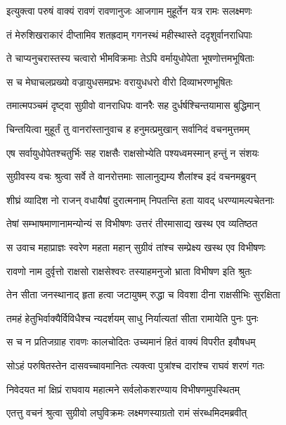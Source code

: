 
\twolineshloka
{इत्युक्त्वा परुषं वाक्यं रावणं रावणानुजः}
{आजगाम मुहूर्तेन यत्र रामः सलक्ष्मणः} %

\twolineshloka
{तं मेरुशिखराकारं दीप्तामिव शतह्रदाम्}
{गगनस्थं महीस्थास्ते ददृशुर्वानराधिपाः} %

\twolineshloka
{ते चाप्यनुचरास्तस्य चत्वारो भीमविक्रमाः}
{तेऽपि वर्मायुधोपेता भूषणोत्तमभूषिताः} %

\twolineshloka
{स च मेघाचलप्रख्यो वज्रायुधसमप्रभः}
{वरायुधधरो वीरो दिव्याभरणभूषितः} %

\twolineshloka
{तमात्मपञ्चमं दृष्ट्वा सुग्रीवो वानराधिपः}
{वानरैः सह दुर्धर्षश्चिन्तयामास बुद्धिमान्} %

\twolineshloka
{चिन्तयित्वा मुहूर्तं तु वानरांस्तानुवाच ह}
{हनुमत्प्रमुखान् सर्वानिदं वचनमुत्तमम्} %

\twolineshloka
{एष सर्वायुधोपेतश्चतुर्भिः सह राक्षसैः}
{राक्षसोभ्येति पश्यध्वमस्मान् हन्तुं न संशयः} %

\twolineshloka
{सुग्रीवस्य वचः श्रुत्वा सर्वे ते वानरोत्तमाः}
{सालानुद्यम्य शैलांश्च इदं वचनमब्रुवन्} %

\twolineshloka
{शीघ्रं व्यादिश नो राजन् वधायैषां दुरात्मनाम्}
{निपतन्ति हता यावद् धरण्यामल्पचेतनाः} %

\twolineshloka
{तेषां सम्भाषमाणानामन्योन्यं स विभीषणः}
{उत्तरं तीरमासाद्य खस्थ एव व्यतिष्ठत} %

\twolineshloka
{स उवाच महाप्राज्ञः स्वरेण महता महान्}
{सुग्रीवं तांश्च सम्प्रेक्ष्य खस्थ एव विभीषणः} %

\twolineshloka
{रावणो नाम दुर्वृत्तो राक्षसो राक्षसेश्वरः}
{तस्याहमनुजो भ्राता विभीषण इति श्रुतः} %

\twolineshloka
{तेन सीता जनस्थानाद् हृता हत्वा जटायुषम्}
{रुद्धा च विवशा दीना राक्षसीभिः सुरक्षिता} %

\twolineshloka
{तमहं हेतुभिर्वाक्यैर्विविधैश्च न्यदर्शयम्}
{साधु निर्यात्यतां सीता रामायेति पुनः पुनः} %

\twolineshloka
{स च न प्रतिजग्राह रावणः कालचोदितः}
{उच्यमानं हितं वाक्यं विपरीत इवौषधम्} %

\twolineshloka
{सोऽहं परुषितस्तेन दासवच्चावमानितः}
{त्यक्त्वा पुत्रांश्च दारांश्च राघवं शरणं गतः} %

\twolineshloka
{निवेदयत मां क्षिप्रं राघवाय महात्मने}
{सर्वलोकशरण्याय विभीषणमुपस्थितम्} %

\twolineshloka
{एतत्तु वचनं श्रुत्वा सुग्रीवो लघुविक्रमः}
{लक्ष्मणस्याग्रतो रामं संरब्धमिदमब्रवीत्} %

